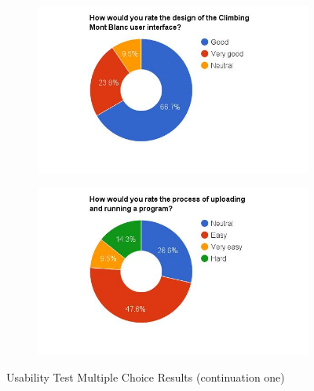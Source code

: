 \begin{figure}
    \hspace*{-1.5cm}
    \begin{subfigure}[h]{0.5\textwidth}
        \includegraphics[width=1.5\textwidth, height=1.0\textwidth]{results/design_cmb.jpg}
        \caption{}
        \label{fig:cmb-design}
    \end{subfigure}
    \hfill
    \begin{subfigure}[h]{0.5\textwidth}
        \includegraphics[width=1.5\textwidth, height=1.0\textwidth]{results/submission_cmb.jpg}
        \caption{}
        \label{fig:cmb-submission}
    \end{subfigure}
    \caption{Usability Test Multiple Choice Results (continuation one)}
    \label{fig:multiplechoice1}
\end{figure}

